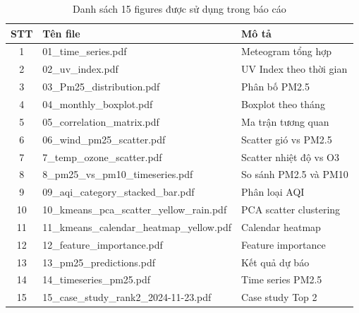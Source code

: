 \documentclass[12pt,a4paper]{article}
\begin{document}
\begin{table}[H]
\centering
\caption{Danh sách 15 figures được sử dụng trong báo cáo}
\begin{tabular}{clp{8cm}}
\toprule
\textbf{STT} & \textbf{Tên file} & \textbf{Mô tả} \\
\midrule
1 & 01\_time\_series.pdf & Meteogram tổng hợp \\
2 & 02\_uv\_index.pdf & UV Index theo thời gian \\
3 & 03\_Pm25\_distribution.pdf & Phân bố PM2.5 \\
4 & 04\_monthly\_boxplot.pdf & Boxplot theo tháng \\
5 & 05\_correlation\_matrix.pdf & Ma trận tương quan \\
6 & 06\_wind\_pm25\_scatter.pdf & Scatter gió vs PM2.5 \\
7 & 7\_temp\_ozone\_scatter.pdf & Scatter nhiệt độ vs O3 \\
8 & 8\_pm25\_vs\_pm10\_timeseries.pdf & So sánh PM2.5 và PM10 \\
9 & 09\_aqi\_category\_stacked\_bar.pdf & Phân loại AQI \\
10 & 10\_kmeans\_pca\_scatter\_yellow\_rain.pdf & PCA scatter clustering \\
11 & 11\_kmeans\_calendar\_heatmap\_yellow.pdf & Calendar heatmap \\
12 & 12\_feature\_importance.pdf & Feature importance \\
13 & 13\_pm25\_predictions.pdf & Kết quả dự báo \\
14 & 14\_timeseries\_pm25.pdf & Time series PM2.5 \\
15 & 15\_case\_study\_rank2\_2024-11-23.pdf & Case study Top 2 \\
\bottomrule
\end{tabular}
\end{table}
\end{document}
